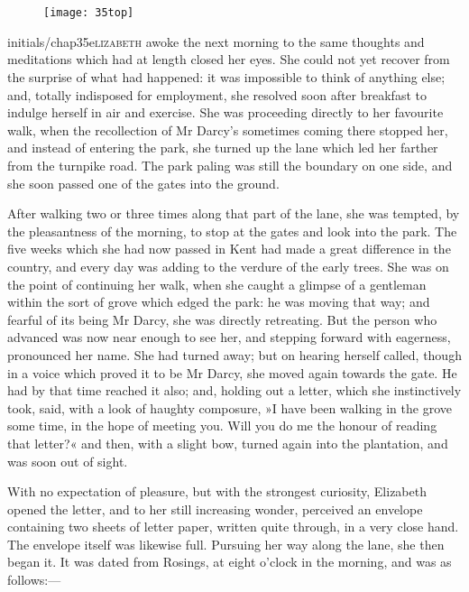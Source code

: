 \chapter[Chapter \thechapter]{}
	
	\begin{figure}[t!]
\centering
\texttt{[image: 35top]}
\end{figure}


\lettrine[lines=6,image=true]{initials/chap35e}{lizabeth}  awoke the next morning to the same thoughts and meditations which had at length closed her eyes. She could not yet recover from the surprise of what had happened: it was impossible to think of anything else; and, totally indisposed for employment, she resolved soon after breakfast to indulge herself in air and exercise. She was proceeding directly to her favourite walk, when the recollection of Mr Darcy's sometimes coming there stopped her, and instead of entering the park, she turned up the lane which led her farther from the turnpike road. The park paling was still the boundary on one side, and she soon passed one of the gates into the ground.

After walking two or three times along that part of the lane, she was tempted, by the pleasantness of the morning, to stop at the gates and look into the park. The five weeks which she had now passed in Kent had made a great difference in the country, and every day was adding to the verdure of the early trees. She was on the point of continuing her walk, when she caught a glimpse of a gentleman within the sort of grove which edged the park: he was moving that way; and fearful of its being Mr Darcy, she was directly retreating. But the person who advanced was now near enough to see her, and stepping forward with eagerness, pronounced her name. She had turned away; but on hearing herself called, though in a voice which proved it to be Mr Darcy, she moved again towards the gate. He had by that time reached it also; and, holding out a letter, which she instinctively took, said, with a look of haughty composure, »I have been walking in the grove some time, in the hope of meeting you. Will you do me the honour of reading that letter?« and then, with a slight bow, turned again into the plantation, and was soon out of sight.

With no expectation of pleasure, but with the strongest curiosity, Elizabeth opened the letter, and to her still increasing wonder, perceived an envelope containing two sheets of letter paper, written quite through, in a very close hand. The envelope itself was likewise full. Pursuing her way along the lane, she then began it. It was dated from Rosings, at eight o'clock in the morning, and was as follows:—


